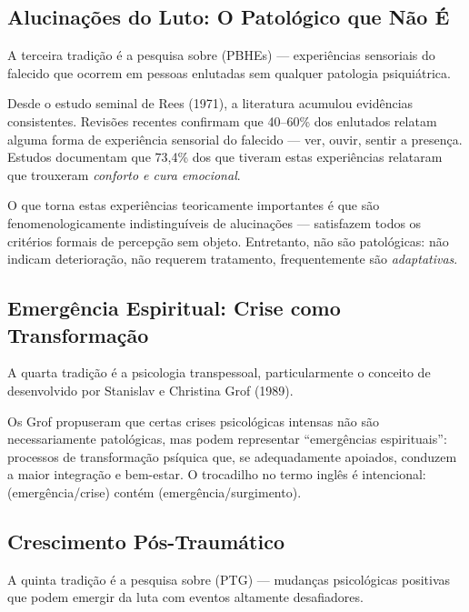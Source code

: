 \subsection{Alucinações do Luto: O Patológico que Não É}

A terceira tradição é a pesquisa sobre  (PBHEs) --- experiências sensoriais do falecido que ocorrem em pessoas enlutadas sem qualquer patologia psiquiátrica.

Desde o estudo seminal de Rees (1971), a literatura acumulou evidências consistentes. Revisões recentes confirmam que 40--60\% dos enlutados relatam alguma forma de experiência sensorial do falecido --- ver, ouvir, sentir a presença. Estudos documentam que 73,4\% dos que tiveram estas experiências relataram que trouxeram \textit{conforto e cura emocional}.

O que torna estas experiências teoricamente importantes é que são fenomenologicamente indistinguíveis de alucinações --- satisfazem todos os critérios formais de percepção sem objeto. Entretanto, não são patológicas: não indicam deterioração, não requerem tratamento, frequentemente são \textit{adaptativas}.

\subsection{Emergência Espiritual: Crise como Transformação}

A quarta tradição é a psicologia transpessoal, particularmente o conceito de  desenvolvido por Stanislav e Christina Grof (1989).

Os Grof propuseram que certas crises psicológicas intensas não são necessariamente patológicas, mas podem representar \enquote{emergências espirituais}: processos de transformação psíquica que, se adequadamente apoiados, conduzem a maior integração e bem-estar. O trocadilho no termo inglês é intencional:  (emergência/crise) contém  (emergência/surgimento).

\subsection{Crescimento Pós-Traumático}

A quinta tradição é a pesquisa sobre  (PTG) --- mudanças psicológicas positivas que podem emergir da luta com eventos altamente desafiadores.

